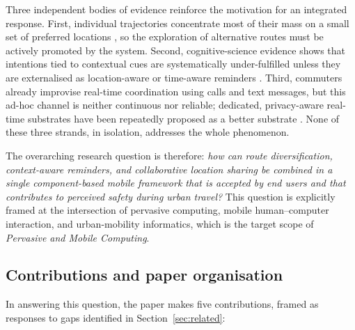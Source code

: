 \documentclass[a4paper,fleqn]{cas-sc}
\begin{document}
	Three independent bodies of evidence reinforce the motivation for an integrated response. First, individual trajectories concentrate most of their mass on a small set of preferred locations \citep{cagney2025urban,liu2022route,song2010predictability}, so the exploration of alternative routes must be actively promoted by the system. Second, cognitive-science evidence shows that intentions tied to contextual cues are systematically under-fulfilled unless they are externalised as location-aware or time-aware reminders \citep{rummel2023prospective,ball2025offloading}. Third, commuters already improvise real-time coordination using calls and text messages, but this ad-hoc channel is neither continuous nor reliable; dedicated, privacy-aware real-time substrates have been repeatedly proposed as a better substrate \citep{li2017locsharing,mckenzie2022privyto,shokri2014mobicrowd}. None of these three strands, in isolation, addresses the whole phenomenon.
	
	The overarching research question is therefore: \emph{how can route diversification, context-aware reminders, and collaborative location sharing be combined in a single component-based mobile framework that is accepted by end users and that contributes to perceived safety during urban travel?} This question is explicitly framed at the intersection of pervasive computing, mobile human--computer interaction, and urban-mobility informatics, which is the target scope of \emph{Pervasive and Mobile Computing}.
	
	\subsection{Contributions and paper organisation}\label{sec:contrib}
	
	In answering this question, the paper makes five contributions, framed as responses to gaps identified in Section~\ref{sec:related}:
	
\end{document}
